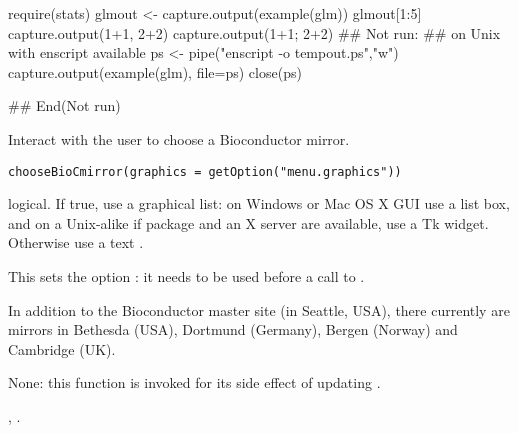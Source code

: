 %
\begin{Examples}
\begin{ExampleCode}
require(stats)
glmout <- capture.output(example(glm))
glmout[1:5]
capture.output(1+1, 2+2)
capture.output({1+1; 2+2})
## Not run: 
## on Unix with enscript available
ps <- pipe("enscript -o tempout.ps","w")
capture.output(example(glm), file=ps)
close(ps)

## End(Not run)
\end{ExampleCode}
\end{Examples}
%
\begin{Description}\relax
Interact with the user to choose a Bioconductor mirror.
\end{Description}
%
\begin{Usage}
\begin{verbatim}
chooseBioCmirror(graphics = getOption("menu.graphics"))
\end{verbatim}
\end{Usage}
%
\begin{Arguments}
\begin{ldescription}
\item[\code{graphics}] logical.  If true, use a graphical list: on Windows or
Mac OS X GUI use a list box, and on a Unix-alike if package
 and an X server are available, use a Tk
widget.  Otherwise use a text .
\end{ldescription}
\end{Arguments}
%
\begin{Details}\relax
This sets the option : it needs to be used before
a call to .

In addition to the Bioconductor master site (in Seattle, USA), there
currently are mirrors in Bethesda (USA), Dortmund (Germany), Bergen
(Norway) and Cambridge (UK).
\end{Details}
%
\begin{Value}
None: this function is invoked for its
side effect of updating .
\end{Value}
%
\begin{SeeAlso}\relax
{}, .
\end{SeeAlso}
